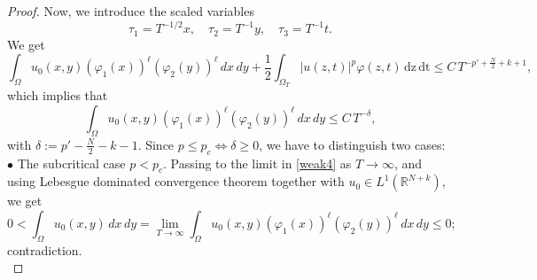 \documentclass[reqno,11pt]{amsart}
\numberwithin{equation}{section}
\begin{document}
\begin{proof}
	Now, we introduce the scaled variables 
	$$\tau_1=T^{-1/2}x,\quad \tau_2=T^{-1}y,\quad \tau_3=T^{-1}t.$$ 
	We get
	\begin{equation}\label{weak3}
		\int_{\Omega}u_0(x,y)\left(\varphi_1(x)\right)^\ell \left(\varphi_2(y)\right)^\ell\,dx\,dy+\frac{1}{2}\int_{\Omega_T}|u(z,t)|^{p}\varphi(z,t)\,\mathrm{dz}\,\mathrm{dt}\leq C\,T^{-p'+\frac{N}{2}+k+1},
	\end{equation}
	which implies that
	\begin{equation}\label{weak4}
		\int_{\Omega}u_0(x,y)\left(\varphi_1(x)\right)^\ell \left(\varphi_2(y)\right)^\ell\,dx\,dy\leq C\,T^{-\delta} ,
	\end{equation}
	with $\delta:=p'-\frac{N}{2}-k-1$. Since $p\leq p_c\Leftrightarrow \delta\geq0$, we have to distinguish two cases:\\
	
	\noindent $\bullet$ The subcritical case $p<p_c$. Passing to the limit in \eqref{weak4} as $T\rightarrow\infty$, and using Lebesgue dominated convergence theorem together with $u_0\in L^1(\mathbb{R}^{N+k})$, we get
	\[
	0<\int_{\Omega}u_0(x,y)\,dx\,dy=\lim_{T\rightarrow\infty}\int_{\Omega}u_0(x,y)\left(\varphi_1(x)\right)^\ell \left(\varphi_2(y)\right)^\ell\,dx\,dy\leq 0;
	\]
	contradiction.\\
	

\end{proof}
\end{document}
